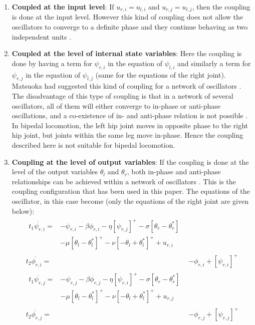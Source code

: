 \documentclass[12pt,twoside]{article}
\theoremstyle{plain}
\theoremstyle{definition}
\theoremstyle{remark}
\begin{document}
\begin{enumerate}
\item \textbf{Coupled at the input level}: If $u_{r,i}=u_{l,i}$ and $u_{r,j}=u_{l,j}$, then the coupling is done at the input level. However this kind of coupling does not allow the oscillators to converge to a definite phase and they continue behaving as two independent units \cite{Ronsse2009}.
\item \textbf{Coupled at the level of internal state variables}: Here the coupling is done by having a term for $\psi_{r,i}$ in the equation of $\psi_{l,i}$ and similarly a term for $\psi_{r,j}$ in the equation of $\psi_{l,j}$ (same for the equations of the right joint). Matsuoka had suggested this kind of coupling for a network of oscillators \cite{Matsuoka1987}. The disadvantage of this type of coupling is that in a network of several oscillators, all of them will either converge to in-phase or anti-phase oscillations, and a co-existence of in- and anti-phase relation is not possible \cite{Ronsse2009}. In bipedal locomotion, the left hip joint moves in opposite phase to the right hip joint, but joints within the same leg move in-phase. Hence the coupling described here is not suitable for bipedal locomotion.
\item \textbf{Coupling at the level of output variables}: If the coupling is done at the level of the output variables $\theta_l$ and $\theta_r$, both in-phase and anti-phase relationships can be achieved within a network of oscillators \cite{Ronsse2009}. This is the coupling configuration that has been used in this paper. The equations of the oscillator, in this case become (only the equations of the right joint are given below):\\

\begin{subequations}
\label{eq:matsuoka_coupled}
%
\begin{align}
\label{eq:matsuoka_coupled1}
\begin{split}
t_1 \dot{\psi_{r,i}}={}& -\psi_{r,i} - \beta \phi_{r,i} - \eta [\psi_{r,j}]^+ - \sigma [\theta_r - \theta^{*}_r]\\ 
& - \mu [\theta_l - \theta_l^*]^+ - \nu [-\theta_l + \theta_l^*]^+ + u_{r,i} 
\end{split}
\\
%
\label{eq:matsuoka_coupled2}
t_2 \dot{\phi_{r,i}} = {}& -\phi_{r,i} + [\psi_{r,i}]^+
\\
%
\label{eq:matsuoka_coupled3}
\begin{split}
t_1 \dot{\psi_{r,j}}={}& -\psi_{r,j} - \beta \phi_{r,j} - \eta [\psi_{r,i}]^+ - \sigma [\theta_r - \theta^{*}_r]\\
& - \mu [\theta_l - \theta_l^*]^+ - \nu [-\theta_l + \theta_l^*]^+ + u_{r,j}
\end{split}
\\
%
\label{eq:matsuoka_coupled4}
t_2 \dot{\phi_{r,j}} ={}& -\phi_{r,j} + [\psi_{r,j}]^+
\end{align}
%
\end{subequations}


\end{enumerate}
\end{document}
